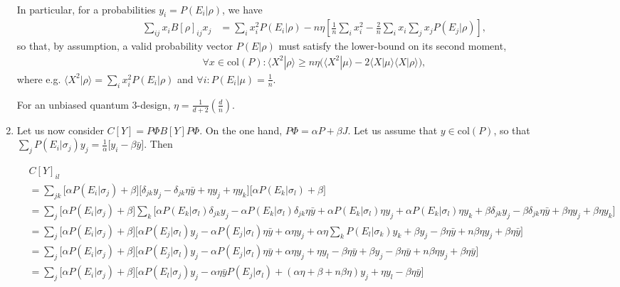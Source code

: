 \documentclass[11pt]{article}
\begin{document}
\begin{enumerate}
\begin{align}
\end{align}
In particular, for a probabilities $y_i =P(E_i|\rho)$, we have
\begin{align}
	\sum_{ij}x_iB[\rho]_{ij}x_j &= \sum_i x_i^2 P(E_i|\rho)-n\eta\left[\frac{1}{n}\sum_i x_i^2 -\frac{2}{n}\sum_ix_i\sum_j x_j P(E_j|\rho)\right],
\end{align}
so that, by assumption, a valid probability vector $P(E|\rho)$ must satisfy the lower-bound on its second moment,
\begin{align}
\forall x \in \text{col}(P):\langle X^2|\rho\rangle\ge 	n\eta\Big(\langle X^2|\mu)-2\langle X|\mu\rangle\langle X|\rho\rangle\Big),
\end{align}
where e.g. $\langle X^2|\rho\rangle=\sum_i x_i^2P(E_i|\rho)$ and $\forall i: P(E_i|\mu)=\frac{1}{n}$.  

For an unbiased quantum 3-design, $\eta=\frac{1}{d+2}\left(\frac{d}{n}\right)$.
\item Let us now consider $C[Y]=P\Phi B[Y] P \Phi$. On the one hand, $P\Phi = \alpha P + \beta J$. Let us assume that $y\in \text{col}(P)$, so that $\sum_{j}P(E_i|\sigma_j)y_j=\frac{1}{\alpha}\Big[y_i -\beta \bar{y}\Big]$. Then
\begin{tiny}
\begin{align*}
&C[Y]_{il}\\
&=\sum_{jk}\Bigg[\alpha P(E_i|\sigma_j)+\beta\Bigg] \Bigg[\delta_{jk}y_j-\delta_{jk}\eta \bar{y}+\eta y_j+\eta y_k\Bigg]\Bigg[\alpha P(E_k|\sigma_l)+\beta \Bigg]	\nonumber\\
&=\sum_{j}\Bigg[\alpha P(E_i|\sigma_j)+\beta\Bigg]\sum_k\Bigg[\alpha P(E_k|\sigma_l)\delta_{jk}y_j-\alpha P(E_k|\sigma_l)\delta_{jk}\eta \bar{y}+\alpha P(E_k|\sigma_l)\eta y_j+\alpha P(E_k|\sigma_l)\eta y_k+\beta\delta_{jk}y_j-\beta\delta_{jk}\eta \bar{y}+\beta\eta y_j+\beta\eta y_k\Bigg]\\
&=\sum_{j}\Bigg[\alpha P(E_i|\sigma_j)+\beta\Bigg]\Bigg[\alpha P(E_j|\sigma_l)y_j-\alpha P(E_j|\sigma_l)\eta \bar{y}+\alpha \eta y_j+\alpha \eta \sum_k P(E_l|\sigma_k) y_k+\beta y_j-\beta\eta \bar{y}+n\beta\eta y_j+\beta\eta \bar{y}\Bigg]\\
&=\sum_{j}\Bigg[\alpha P(E_i|\sigma_j)+\beta\Bigg]\Bigg[\alpha P(E_j|\sigma_l)y_j-\alpha P(E_j|\sigma_l)\eta \bar{y}+\alpha \eta y_j+\eta y_l-\beta \eta \bar{y} +\beta y_j-\beta\eta \bar{y}+n\beta\eta y_j+\beta\eta \bar{y}\Bigg]\\
&=\sum_{j}\Bigg[\alpha P(E_i|\sigma_j)+\beta\Bigg]\Bigg[\alpha P(E_l|\sigma_j)y_j-\alpha \eta \bar{y}P(E_j|\sigma_l) +(\alpha \eta +\beta+n\beta \eta )y_j+\eta y_l -\beta\eta \bar{y}\Bigg]\\

\end{align*}
\end{tiny}
\end{enumerate}
\end{document}

